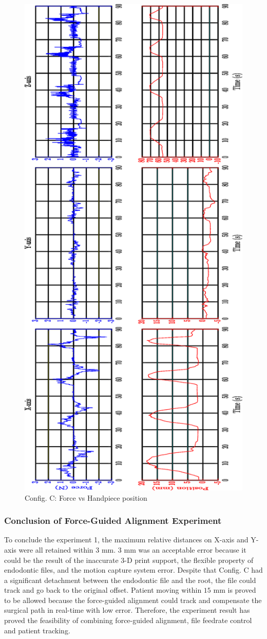 \begin{figure}[htbp]
\begin{center}
\includegraphics[width=0.7\linewidth]{Images/exp/ConfigC_3.eps}
\caption{Config. C: Force vs Handpiece position}
\label{fig: exp1_3_3}
\end{center}
\end{figure}

\subsubsection{Conclusion of Force-Guided Alignment Experiment}
\hspace*{6mm}To conclude the experiment 1, the maximum relative distances on X-axis and Y-axis were all retained within $3$ mm. $3$ mm was an acceptable error because it could be the result of the inaccurate 3-D print support, the flexible property of endodontic files, and the motion capture system error. Despite that Config. C had a significant detachment between the endodontic file and the root, the file could track and go back to the original offset. Patient moving within $15$ mm is proved to be allowed because the force-guided alignment could track and compensate the surgical path in real-time with low error. Therefore, the experiment result has proved the feasibility of combining force-guided alignment, file feedrate control and patient tracking.

